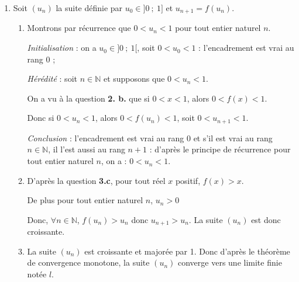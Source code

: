 \documentclass[10pt]{article}
\providecommand{\N}{\mathbb{N}}
\begin{document}
\begin{enumerate}
\begin{enumerate}
$y=f'(1)(x-1)+f(1)$

		 Avec $f'(1)=1$ et $f(1)=1$, on en déduit l'équation de $(T)~:~y=x-1+1=x$, soit 

$M(x~;~y) \in (T) \iff y = x$.
		\item Nous savons que $\forall x \in ]0~;~+\infty[$, $f'(x)=\ln(x)+1$.

		La fonction $f'$  est continue et dérivable sur $]0~;~+\infty[$, et $f''(x)=\dfrac{1}{x}>0$, donc $f$ est convexe sur $]0~;~+\infty[$.
		\item La courbe représentative d'une fonction convexe est au-dessus de toutes ses tangentes. En particulier $\mathcal{C}_f$ est au-dessus de $(T)$. Donc $\forall x \in ]0~;~+\infty[$, $f(x)\geqslant x$.
	\end{enumerate}
	\item Soit $\left(u_n\right)$ la suite définie par $u_0 \in ]0~;~1]$ et $u_{n+1}=f(u_n)$.
	\begin{enumerate}
		\item Montrons par récurrence que $0 < u_n <1$ pour tout entier naturel $n$.
		
\emph{Initialisation} : on a $u_0 \in ]0~;~1[$, soit $0 < u_0 < 1$ : l'encadrement est vrai au rang $0$ ;

\emph{Hérédité} : soit $n \in \N$ et supposons que $0 < u_n < 1$.

On a vu à la question \textbf{2. b.} que si $0 < x < 1$, alors $0 < f(x) < 1$.

Donc si $0 < u_n < 1$, alors $0 < f\left(u_n\right) < 1$, soit $0 < u_{n+1} < 1$.

\emph{Conclusion} : l'encadrement est vrai au rang 0 et s'il est vrai au rang $n \in \N$, il l'est aussi au rang $n + 1$ : d'après le principe de récurrence pour tout entier naturel $n$, on a : $0 < u_n < 1$.
		

		\item D'après la question \textbf{3.c}, pour tout réel $x$ positif, $f(x)>x$.

De plus pour tout entier naturel $n$, $u_n>0$

Donc, $\forall n \in \N$, $f(u_n)>u_n$ donc $u_{n+1}>u_n$. La suite $\left(u_n\right)$ est donc croissante.
		 \item La suite $\left(u_n\right)$ est croissante et majorée par 1. Donc d'après le théorème de convergence monotone, la suite $\left(u_n\right)$ converge vers une limite finie notée $l$.
	\end{enumerate}
\end{enumerate}

\pagebreak
\end{document}
